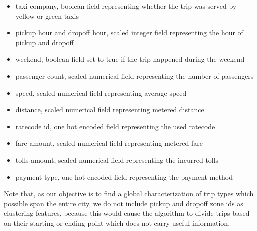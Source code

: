 \documentclass{acm_proc_article-sp-sigmod09}
\begin{document}
\begin{itemize}
	\item taxi company, boolean field representing whether the trip was served by yellow or green taxis
	\item pickup hour and dropoff hour, scaled integer field representing the hour of pickup and dropoff
	\item weekend, boolean field set to true if the trip happened during the weekend
	\item passenger count, scaled numerical field representing the number of passengers
	\item speed, scaled numerical field representing average speed
	\item distance, scaled numerical field representing metered distance
	\item ratecode id, one hot encoded field representing the used ratecode
	\item fare amount, scaled numerical field representing metered fare
	\item tolls amount, scaled numerical field representing the incurred tolls
	\item payment type, one hot encoded field representing the payment method
	
\end{itemize}  

Note that, as our objective is to find a global characterization of trip types which possible span the entire city, we do not include pickup and dropoff zone ids as clustering features, because this would cause the algorithm to divide trips based on their starting or ending point which does not carry useful information.
\end{document}
